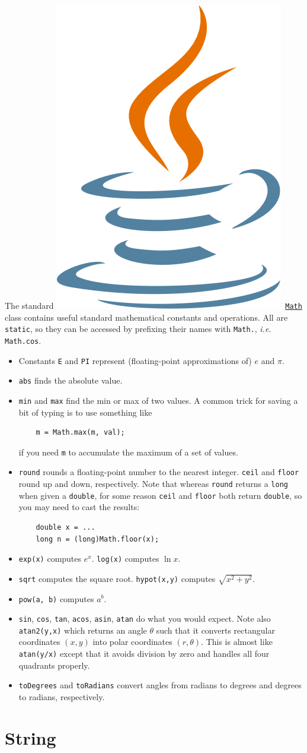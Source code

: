 \documentclass[10pt]{book}
\newcommand{\javalogo}{\includegraphics[height=0.9\baselineskip]{Java}}
\newcommand*{\javadoclink}[2]{\href{https://docs.oracle.com/javase/10/docs/api/java/#1/#2.html}{\texttt{#2}}}
\newcommand*{\javadoc}[2]{\javalogo\ \javadoclink{#1}{#2}}
\newcommand{\ie}{\emph{i.e.}\xspace}
\begin{document}
The standard \javadoc{lang}{Math} class contains useful standard
mathematical constants and operations.  All are \texttt{static}, so
they can be accessed by prefixing their names with \texttt{Math.}, \ie
\texttt{Math.cos}.
\begin{itemize}
\item Constants \texttt{E} and \texttt{PI} represent (floating-point
  approximations of) $e$ and $\pi$.
\item \texttt{abs} finds the absolute value.
\item \texttt{min} and \texttt{max} find the min or max of two
  values. A common trick for saving a bit of typing is to use
  something like
  \begin{verbatim}
    m = Math.max(m, val);
  \end{verbatim}
  if you need \texttt{m} to accumulate the maximum of a set of values.
\item \texttt{round} rounds a floating-point number to the nearest
  integer. \texttt{ceil} and \texttt{floor} round up and down,
  respectively.  Note that whereas \texttt{round}
  returns a \texttt{long} when given a \texttt{double}, for some
  reason \texttt{ceil} and \texttt{floor} both return
  \texttt{double}, so you may need to cast the results:
  \begin{verbatim}
    double x = ...
    long n = (long)Math.floor(x);
  \end{verbatim}
\item \texttt{exp(x)} computes $e^x$.  \texttt{log(x)} computes $\ln x$.
\item \texttt{sqrt} computes the square root.  \texttt{hypot(x,y)}
  computes $\sqrt{x^2 + y^2}$.
\item \texttt{pow(a, b)} computes $a^b$.
\item \texttt{sin}, \texttt{cos}, \texttt{tan}, \texttt{acos},
  \texttt{asin}, \texttt{atan} do what you would expect. Note also
  \texttt{atan2(y,x)} which returns an angle $\theta$ such that
  it converts rectangular coordinates $(x,y)$ into polar coordinates
  $(r, \theta)$.  This is almost like \texttt{atan(y/x)} except that
  it avoids division by zero and handles all four quadrants properly.
\item \texttt{toDegrees} and \texttt{toRadians} convert angles from
  radians to degrees and degrees to radians, respectively.
\end{itemize}


\section{String}
\end{document}
